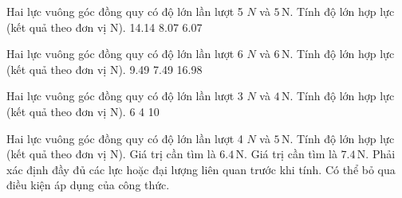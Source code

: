 \begin{ex}
Hai lực vuông góc đồng quy có độ lớn lần lượt 5 $N$ và $5\,\text{N}$. Tính độ lớn hợp lực (kết quả theo đơn vị N).
\choice
{14.14}
{8.07}
{6.07}
{}
\end{ex}

\begin{ex}
Hai lực vuông góc đồng quy có độ lớn lần lượt 6 $N$ và $6\,\text{N}$. Tính độ lớn hợp lực (kết quả theo đơn vị N).
\choice
{}
{9.49}
{7.49}
{16.98}
\end{ex}

\begin{ex}
Hai lực vuông góc đồng quy có độ lớn lần lượt 3 $N$ và $4\,\text{N}$. Tính độ lớn hợp lực (kết quả theo đơn vị N).
\choice
{6}
{}
{4}
{10}
\end{ex}

\begin{ex}
Hai lực vuông góc đồng quy có độ lớn lần lượt 4 $N$ và $5\,\text{N}$. Tính độ lớn hợp lực (kết quả theo đơn vị N).
\choiceTF
{\True Giá trị cần tìm là $6.4\,\text{N}$.}
{Giá trị cần tìm là $7.4\,\text{N}$.}
{\True Phải xác định đầy đủ các lực hoặc đại lượng liên quan trước khi tính.}
{Có thể bỏ qua điều kiện áp dụng của công thức.}
\end{ex}


